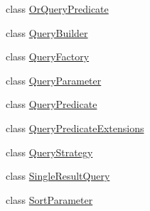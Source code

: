 \begin{DoxyCompactItemize}
\item 
class \hyperlink{classCqrs_1_1Repositories_1_1Queries_1_1OrQueryPredicate}{Or\+Query\+Predicate}
\item 
class \hyperlink{classCqrs_1_1Repositories_1_1Queries_1_1QueryBuilder}{Query\+Builder}
\item 
class \hyperlink{classCqrs_1_1Repositories_1_1Queries_1_1QueryFactory}{Query\+Factory}
\item 
class \hyperlink{classCqrs_1_1Repositories_1_1Queries_1_1QueryParameter}{Query\+Parameter}
\item 
class \hyperlink{classCqrs_1_1Repositories_1_1Queries_1_1QueryPredicate}{Query\+Predicate}
\item 
class \hyperlink{classCqrs_1_1Repositories_1_1Queries_1_1QueryPredicateExtensions}{Query\+Predicate\+Extensions}
\item 
class \hyperlink{classCqrs_1_1Repositories_1_1Queries_1_1QueryStrategy}{Query\+Strategy}
\item 
class \hyperlink{classCqrs_1_1Repositories_1_1Queries_1_1SingleResultQuery}{Single\+Result\+Query}
\item 
class \hyperlink{classCqrs_1_1Repositories_1_1Queries_1_1SortParameter}{Sort\+Parameter}
\end{DoxyCompactItemize}
